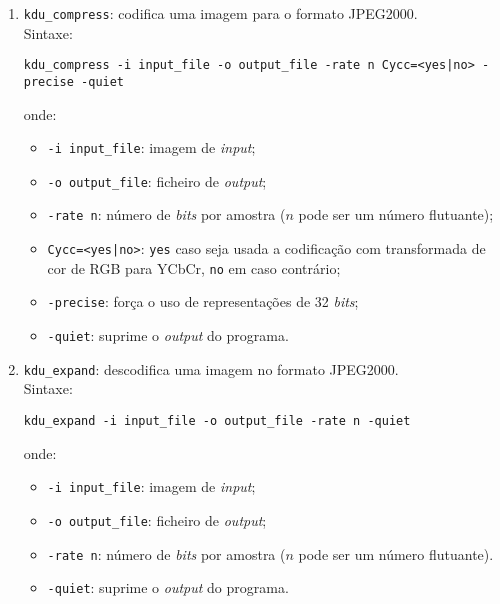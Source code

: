 \begin{enumerate}
    \item \texttt{kdu\_compress}: codifica uma imagem para o formato JPEG2000.\\
    Sintaxe:
    \begin{verbatim}
kdu_compress -i input_file -o output_file -rate n Cycc=<yes|no> -precise -quiet
    \end{verbatim}
    onde:
    \begin{itemize}
        \item \verb|-i input_file|: imagem de \textit{input};
        \item \verb|-o output_file|: ficheiro de \textit{output};
        \item \verb|-rate n|: número de \textit{bits} por amostra ($n$ pode ser um número flutuante);
        \item \verb#Cycc=<yes|no>#: \verb|yes| caso seja usada a codificação com transformada de cor de RGB para YCbCr, \verb|no| em caso contrário;
        \item \verb|-precise|: força o uso de representações de 32 \textit{bits};
        \item \verb|-quiet|: suprime o \textit{output} do programa.
    \end{itemize}
    
    \item \texttt{kdu\_expand}: descodifica uma imagem no formato JPEG2000.\\
    Sintaxe:
    \begin{verbatim}
kdu_expand -i input_file -o output_file -rate n -quiet
    \end{verbatim}
    onde:
    \begin{itemize}
        \item \verb|-i input_file|: imagem de \textit{input};
        \item \verb|-o output_file|: ficheiro de \textit{output};
        \item \verb|-rate n|: número de \textit{bits} por amostra ($n$ pode ser um número flutuante).
        \item \verb|-quiet|: suprime o \textit{output} do programa.
    \end{itemize}
\end{enumerate}


